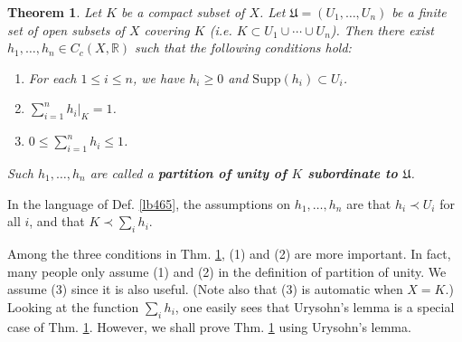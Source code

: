 \documentclass[12pt,b5paper,notitlepage]{article}
\theoremstyle{definition}
\theoremstyle{plain}
\newtheorem{thm}[df]{Theorem}
\newcommand{\fk}{\mathfrak}
\newcommand{\Rbb}{\mathbb R}
\newcommand{\Supp}{\mathrm{Supp}}
\newcommand{\dps}{\displaystyle}
\numberwithin{equation}{section}
\begin{document}
\begin{thm}\label{lb466}
Let $K$ be a compact subset of $X$. Let $\fk U=(U_1,\dots,U_n)$ be a finite set of open subsets of $X$ covering $K$ (i.e. $K\subset U_1\cup\cdots\cup U_n$). Then there exist $h_1,\dots,h_n\in C_c(X,\Rbb)$ such that the following conditions hold:
\begin{enumerate}[label=(\arabic*)]
\item For each $1\leq i\leq n$, we have $h_i\geq 0$ and $\Supp (h_i)\subset U_i$.
\item  $\dps\sum_{i=1}^nh_i\big|_K=1$.
\item $\dps 0\leq\sum_{i=1}^nh_i\leq 1$. 
\end{enumerate}
Such $h_1,\dots,h_n$ are called a \textbf{partition of unity of $K$ subordinate to $\fk U$}. 
\end{thm}

In the language of Def. \ref{lb465}, the assumptions on $h_1,\dots,h_n$ are that $h_i\prec U_i$ for all $i$, and that $K\prec\sum_i h_i$. 

Among the three conditions in Thm. \ref{lb466}, (1) and (2) are more important. In fact, many people only assume (1) and (2) in the definition of partition of unity. We assume (3) since it is also useful. (Note also that (3) is automatic when $X=K$.) Looking at the function $\sum_i h_i$, one easily sees that Urysohn's lemma is a special case of Thm. \ref{lb466}. However, we shall prove Thm. \ref{lb466} using Urysohn's lemma. 
\end{document}
